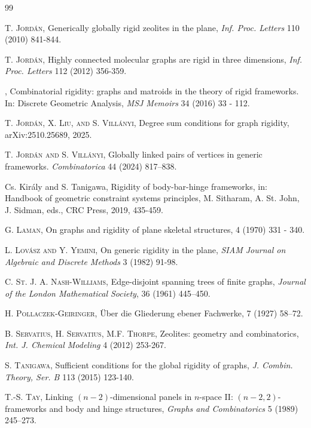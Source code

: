 \documentclass[11pt,a4paper]{article}
\theoremstyle{definition}
\begin{document}
\begin{thebibliography}{99}
    
     {\scshape T. Jord\'an}, Generically globally rigid zeolites in the
    plane,
    {\it Inf. Proc. Letters} 110 (2010) 841-844.
    
     {\scshape T. Jord\'an}, Highly connected molecular graphs are rigid
    in three dimensions, 
    {\it Inf. Proc. Letters} 112 (2012) 356-359.
    
    ,			Combinatorial rigidity: graphs and matroids			in the theory of rigid frameworks. In: Discrete Geometric Analysis,			{\it MSJ Memoirs} 34 (2016) 33 - 112.

     {\scshape T. Jordán, X. Liu, and S. Villányi}, Degree sum conditions for graph rigidity, arXiv:2510.25689, 2025.
    
     {\scshape T. Jordán and S. Villányi}, Globally linked pairs of vertices in generic frameworks. {\it Combinatorica} 44 (2024)  817–838.
    
    
     {\sc Cs. Kir\'aly and S. Tanigawa}, Rigidity of body-bar-hinge frameworks, in: Handbook of geometric constraint systems principles, M. Sitharam, A. St. John, J. Sidman, eds., CRC Press, 2019, 435-459.
    
     {\scshape G. Laman},
    \newblock On graphs and rigidity of plane
    skeletal structures,
     4
     (1970) 331 - 340.
    
    	{\scshape L. Lov\'asz and Y. Yemini},
    {On {{generic rigidity}} in the {{plane}}},
    {\it SIAM Journal on Algebraic and Discrete Methods} 3 (1982)
    91-98.			

 {\scshape C. St. J. A. Nash-Williams}, Edge-disjoint spanning trees of finite graphs, {\it Journal of the London
Mathematical Society}, 36 (1961) 445–450.
 

 {\scshape H. Pollaczek-Geiringer}, \newblock \"{U}ber die Gliederung ebener Fachwerke,  7  (1927) 58--72.

 {\scshape B. Servatius, H. Servatius, M.F. Thorpe}, Zeolites: geometry and combinatorics,
{\it Int. J. Chemical Modeling} 4 (2012) 253-267.
    
     {\scshape S. Tanigawa}, Sufficient conditions for the global rigidity of graphs,
    {\it J. Combin. Theory, Ser. B}  113 (2015) 123-140.
    
    
    {\scshape T.-S. Tay}, Linking $(n-2)$-dimensional panels in $n$-space II:
    $(n-2,2)$-frameworks and body and hinge structures,
    {\it Graphs and Combinatorics} 5  (1989) 245–273.
    

\end{thebibliography}
\end{document}
